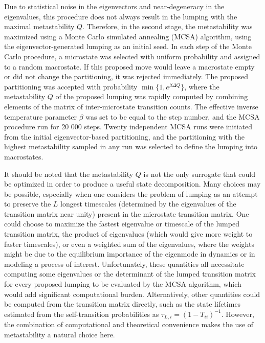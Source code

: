Due to statistical noise in the eigenvectors and near-degeneracy in the eigenvalues, this procedure does not always result in the lumping with the maximal metastability $Q$.
Therefore, in the second stage, the metastability was maximized using a Monte Carlo simulated annealing (MCSA) algorithm, using the eigenvector-generated lumping as an initial seed.
In each step of the Monte Carlo procedure, a microstate was selected with uniform probability and assigned to a random macrostate.
If this proposed move would leave a macrostate empty or did not change the partitioning, it was rejected immediately.
The proposed partitioning was accepted with probability $\min \{1, e^{\beta \Delta Q} \}$, where the metastability $Q$ of the proposed lumping was rapidly computed by combining elements of the matrix of inter-microstate transition counts.
The effective inverse temperature parameter $\beta$ was set to be equal to the step number, and the MCSA procedure run for 20 000 steps.
Twenty independent MCSA runs were initiated from the initial eigenvector-based partitioning, and the partitioning with the highest metastability sampled in any run was selected to define the lumping into macrostates.

It should be noted that the metastability $Q$ is not the only surrogate that could be optimized in order to produce a useful state decomposition.
Many choices may be possible, especially when one considers the problem of lumping as an attempt to preserve the $L$ longest timescales (determined by the eigenvalues of the transition matrix near unity) present in the microstate transition matrix.
One could choose to maximize the fastest eigenvalue or timescale of the lumped transition matrix, the product of eigenvalues (which would give more weight to faster timescales), or even a weighted sum of the eigenvalues, where the weights might be due to the equilibrium importance of the eigenmode in dynamics or in modeling a process of interest.
Unfortunately, these quantities all necessitate computing some eigenvalues or the determinant of the lumped transition matrix for every proposed lumping to be evaluated by the MCSA algorithm, which would add significant computational burden.
Alternatively, other quantities could be computed from the transition matrix directly, such as the state lifetimes estimated from the self-transition probabilities as $\tau_{L,i} = (1 - T_{ii})^{-1}$.
However, the combination of computational and theoretical convenience makes the use of metastability a natural choice here.

